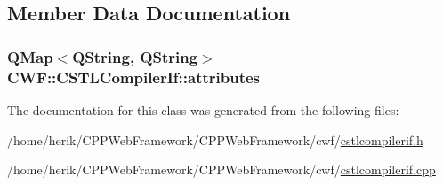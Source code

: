 \subsection{Member Data Documentation}
\hypertarget{class_c_w_f_1_1_c_s_t_l_compiler_if_a63f36fca57a21e38d555b6e52173ef0a}{
\subsubsection[{attributes}]{\setlength{\rightskip}{0pt plus 5cm}Q\+Map$<$Q\+String, Q\+String$>$ C\+W\+F\+::\+C\+S\+T\+L\+Compiler\+If\+::attributes}}\label{class_c_w_f_1_1_c_s_t_l_compiler_if_a63f36fca57a21e38d555b6e52173ef0a}


The documentation for this class was generated from the following files\+:\begin{DoxyCompactItemize}
\item 
/home/herik/\+C\+P\+P\+Web\+Framework/\+C\+P\+P\+Web\+Framework/cwf/\hyperlink{cstlcompilerif_8h}{cstlcompilerif.\+h}\item 
/home/herik/\+C\+P\+P\+Web\+Framework/\+C\+P\+P\+Web\+Framework/cwf/\hyperlink{cstlcompilerif_8cpp}{cstlcompilerif.\+cpp}\end{DoxyCompactItemize}
